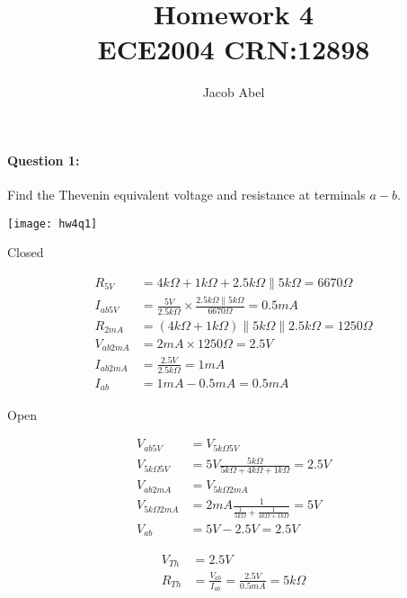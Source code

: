 \documentclass[12pt,letterpaper,titlepage]{article}
\author{Jacob Abel}
\title{	Homework 4
	\\\large ECE2004 CRN:12898
}
\begin{document}
\maketitle
\begin{raggedright}

\paragraph{Question 1: }

Find the Thevenin equivalent voltage and resistance at terminals $a-b$.

\begin{center}
\texttt{[image: hw4q1]}
\end{center}

\begin{paracol}{2}
\begin{center}Closed\end{center}
\begin{align*}
    R_{5V}    &= 4k\Omega + 1k\Omega + 2.5k\Omega\parallel 5k\Omega = 6670\Omega
\\  I_{ab5V}  &= \frac{5V}{2.5k\Omega}
				 \times
				 \frac{2.5k\Omega\parallel 5k\Omega}{6670\Omega} = 0.5mA
\\  R_{2mA}   &= (4k\Omega + 1k\Omega)\parallel 5k\Omega \parallel 2.5k\Omega = 1250\Omega
\\  V_{ab2mA} &= 2mA \times 1250\Omega = 2.5V
\\  I_{ab2mA} &= \frac{2.5V}{2.5k\Omega} = 1mA
\\  I_{ab}    &= 1mA -0.5mA = 0.5mA
\end{align*}
\switchcolumn
\begin{center}Open\end{center}
\begin{align*}
    V_{ab5V}  &= V_{5k\Omega5V}
\\  V_{5k\Omega5V}  &= 5V\frac{5k\Omega}{5k\Omega + 4k\Omega + 1k\Omega} = 2.5V
\\  V_{ab2mA} &= V_{5k\Omega2mA}
\\  V_{5k\Omega2mA} &= 2mA\frac{1}{\frac{1}{5k\Omega}+\frac{1}{4k\Omega+1k\Omega}} = 5V
\\  V_{ab} &= 5V - 2.5V = 2.5V
\end{align*}
\end{paracol}
\begin{align*}
    V_{Th} &= 2.5V
\\  R_{Th} &= \frac{V_{ab}}{I_{ab}} = \frac{2.5V}{0.5mA} = 5k\Omega
\end{align*}
\clearpage


\end{raggedright}
\end{document}
